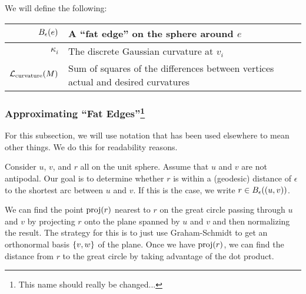 We will define the following: \begin{center}\begin{tabular}{r|l}
	\(B_{\epsilon}\pof{e}\) & A ``fat edge'' on the sphere around \(e\) \\ \hline
	\(\kappa_i\) & The discrete Gaussian curvature at \(v_i\) \\ \hline
	\(\mathcal{L}_{\mathrm{curvature}}\pof{M}\) & Sum of squares of the differences between vertices actual and desired curvatures
\end{tabular}\end{center}

\subsubsection[Approximating ``Fat Edges'']{Approximating ``Fat Edges''\footnote{This name should really be changed...}}
For this subsection, we will use notation that has been used elsewhere to mean other things. We do this for readability reasons.

Consider \(u\), \(v\), and \(r\) all on the unit sphere. Assume that \(u\) and \(v\) are not antipodal. Our goal is to determine whether \(r\) is within a (geodesic) distance of \(\epsilon\) to the shortest arc between \(u\) and \(v\). If this is the case, we write \(r \in B_\epsilon\pof{\pof{u, v}}\).

We can find the point \(\proj\pof{r}\) nearest to \(r\) on the great circle passing through \(u\) and \(v\) by projecting \(r\) onto the plane spanned by \(u\) and \(v\) and then normalizing the result. The strategy for this is to just use Graham-Schmidt to get an orthonormal basis \(\cof{v, w}\) of the plane. Once we have \(\proj\pof{r}\), we can find the distance from \(r\) to the great circle by taking advantage of the dot product.

